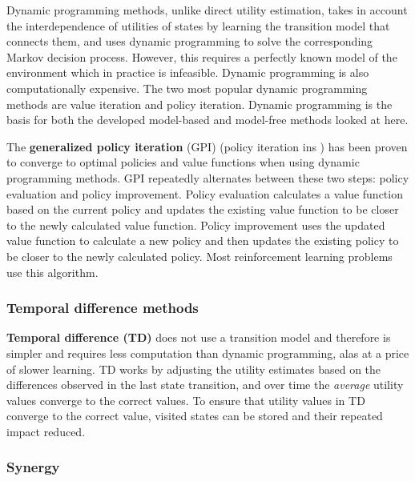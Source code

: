 Dynamic programming methods, unlike direct utility estimation, takes in
account the interdependence of utilities of states by learning the transition
model that connects them, and uses dynamic programming to solve the
corresponding Markov decision process. However, this requires a perfectly known
model of the environment which in practice is infeasible. Dynamic programming
is also computationally expensive. The two most popular dynamic programming
methods are value iteration and policy iteration. Dynamic programming is the
basis for both the developed model-based and model-free methods looked at here.
\parencite{Sutton1998ai+reinforcement}

The \textbf{generalized policy iteration} (GPI) (policy iteration ins
\textcite{Russell2010ai+modern}) has been proven to converge to optimal
policies and value functions when using dynamic programming methods. GPI
repeatedly alternates between these two steps: policy evaluation and policy
improvement. Policy evaluation calculates a value function based on the current
policy and updates the existing value function to be closer to the newly
calculated value function. Policy improvement uses the updated value function
to calculate a new policy and then updates the existing policy to be closer to
the newly calculated policy. Most reinforcement learning problems use this
algorithm. \parencite{Sutton1998ai+reinforcement}


\subsubsection{Temporal difference methods}
\label{sec:ai:temporal}

\textbf{Temporal difference (TD)} does not use a transition model and therefore
is simpler and requires less computation than dynamic programming, alas at a
price of slower learning. TD works by adjusting the utility estimates based on
the differences observed in the last state transition, and over time the
\textit{average} utility values converge to the correct values. To ensure that
utility values in TD converge to the correct value, visited states can be
stored and their repeated impact reduced. \parencite{Russell2010ai+modern}


\subsubsection{Synergy}
\label{sec:ai:synergy}
